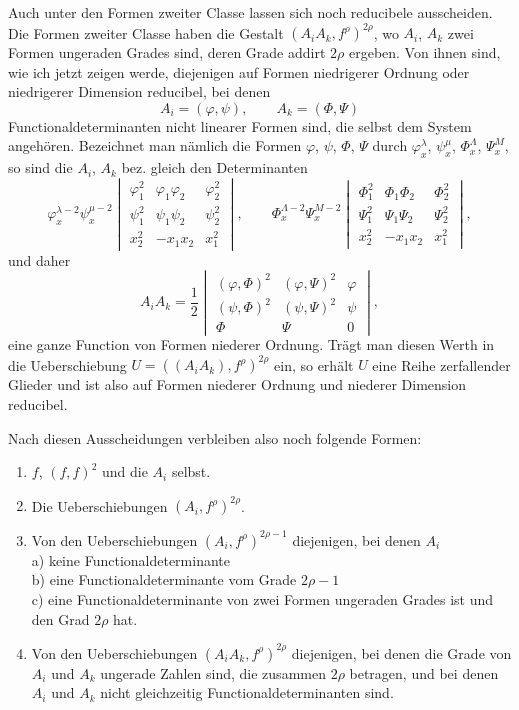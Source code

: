 \documentclass[10pt]{article}
\begin{document}
Auch unter den Formen zweiter Classe lassen sich noch reducibele ausscheiden. Die Formen zweiter Classe haben die Gestalt $(A_iA_k,f^\rho)^{2\rho}$, wo $A_i$, $A_k$ zwei Formen ungeraden Grades sind, deren Grade addirt $2\rho$ ergeben. Von ihnen sind, wie ich jetzt zeigen werde, diejenigen auf Formen niedrigerer Ordnung oder niedrigerer Dimension reducibel, bei denen
\[
A_i=(\varphi,\psi),
\qquad
A_k=(\Phi,\Psi)
\]
Functionaldeterminanten nicht linearer Formen sind, die selbst dem System angehören. Bezeichnet man nämlich die Formen $\varphi$, $\psi$, $\Phi$, $\Psi$ durch $\varphi_x^\lambda$, $\psi_x^\mu$, $\Phi_x^\Lambda$, $\Psi_x^M$, so sind die $A_i$, $A_k$ bez. gleich den Determinanten
\[
\varphi_x^{\lambda-2}\psi_x^{\mu-2}
\begin{vmatrix}
\varphi_1^2&\varphi_1\varphi_2&\varphi_2^2\\
\psi_1^2&\psi_1\psi_2&\psi_2^2\\
x_2^2&-x_1x_2&x_1^2
\end{vmatrix},
\qquad
\Phi_x^{\Lambda-2}\Psi_x^{M-2}
\begin{vmatrix}
\Phi_1^2&\Phi_1\Phi_2&\Phi_2^2\\
\Psi_1^2&\Psi_1\Psi_2&\Psi_2^2\\
x_2^2&-x_1x_2&x_1^2
\end{vmatrix},
\]
und daher
\[
A_iA_k=\frac12
\begin{vmatrix}
(\varphi,\Phi)^2&(\varphi,\Psi)^2&\varphi\\
(\psi,\Phi)^2&(\psi,\Psi)^2&\psi\\
\Phi&\Psi&0
\end{vmatrix},
\]
eine ganze Function von Formen niederer Ordnung. Trägt man diesen Werth in die Ueberschiebung $U=((A_iA_k),f^\rho)^{2\rho}$ ein, so erhält $U$ eine Reihe zerfallender Glieder und ist also auf Formen niederer Ordnung und niederer Dimension reducibel.

Nach diesen Ausscheidungen verbleiben also noch folgende Formen:
\begin{enumerate}
\item $f$, $(f,f)^2$ und die $A_i$ selbst.
\item Die Ueberschiebungen $(A_i,f^\rho)^{2\rho}$.
\item Von den Ueberschiebungen $(A_i,f^\rho)^{2\rho-1}$ diejenigen, bei denen $A_i$\\
a) keine Functionaldeterminante\\
b) eine Functionaldeterminante vom Grade $2\rho-1$\\
c) eine Functionaldeterminante von zwei Formen ungeraden Grades ist und den Grad $2\rho$ hat.
\item Von den Ueberschiebungen $(A_iA_k,f^\rho)^{2\rho}$ diejenigen, bei denen die Grade von $A_i$ und $A_k$ ungerade Zahlen sind, die zusammen $2\rho$ betragen, und bei denen $A_i$ und $A_k$ nicht gleichzeitig Functionaldeterminanten sind.
\end{enumerate}
\end{document}
